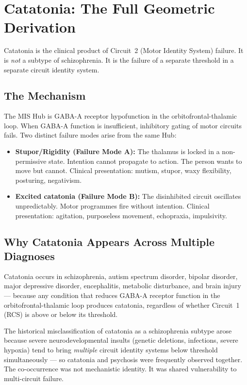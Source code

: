 \documentclass[12pt,a4paper]{article}
\begin{document}
\section{Catatonia: The Full Geometric Derivation}

Catatonia is the clinical product of Circuit~2 (Motor Identity
System) failure. It is \emph{not} a subtype of schizophrenia.
It is the failure of a separate threshold in a separate circuit
identity system.

\subsection{The Mechanism}

The MIS Hub is GABA-A receptor hypofunction in the
orbitofrontal-thalamic loop. When GABA-A function is
insufficient, inhibitory gating of motor circuits fails.
Two distinct failure modes arise from the same Hub:

\begin{itemize}
  \item \textbf{Stupor/Rigidity (Failure Mode A):} The
    thalamus is locked in a non-permissive state. Intention
    cannot propagate to action. The person wants to move
    but cannot. Clinical presentation: mutism, stupor,
    waxy flexibility, posturing, negativism.

  \item \textbf{Excited catatonia (Failure Mode B):} The
    disinhibited circuit oscillates unpredictably. Motor
    programmes fire without intention. Clinical presentation:
    agitation, purposeless movement, echopraxia, impulsivity.
\end{itemize}

\subsection{Why Catatonia Appears Across Multiple Diagnoses}

Catatonia occurs in schizophrenia, autism spectrum disorder,
bipolar disorder, major depressive disorder, encephalitis,
metabolic disturbance, and brain injury --- because any
condition that reduces GABA-A receptor function in the
orbitofrontal-thalamic loop produces catatonia, regardless
of whether Circuit~1 (RCS) is above or below its threshold.

The historical misclassification of catatonia as a
schizophrenia subtype arose because severe neurodevelopmental
insults (genetic deletions, infections, severe hypoxia) tend
to bring \emph{multiple} circuit identity systems below
threshold simultaneously --- so catatonia and psychosis
were frequently observed together. The co-occurrence was not
mechanistic identity. It was shared vulnerability to
multi-circuit failure.
\end{document}

